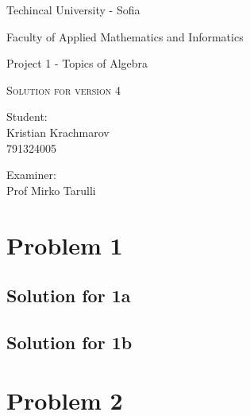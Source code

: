 \documentclass[a4paper,fleqn,12pt]{article}
\begin{document}
\begin{titlepage}
	\setlength{\parindent}{0pt}
	\large
\centering
Techincal University - Sofia \par
Faculty of Applied Mathematics and Informatics \par
\vspace{2cm}

{\huge Project 1 - Topics of Algebra\par}

\vspace{2cm}

\vspace{1cm}
{\LARGE\scshape  Solution for version 4 \par}



\vfill

\begin{minipage}[t]{.5\linewidth}
	Student: \\
	Kristian Krachmarov \\
	791324005
\end{minipage}%
\begin{minipage}[t]{.5\linewidth}
	\raggedleft
	Examiner:\\
	Prof Mirko Tarulli
\end{minipage}

\vspace{2cm}
\raggedright

\end{titlepage}
\tableofcontents
\newpage
{}
\newpage


\newpage

\section{Problem 1}
\subsection{Solution for 1a}
\subsection{Solution for 1b}

\newpage

\section{Problem 2}
\end{document}
